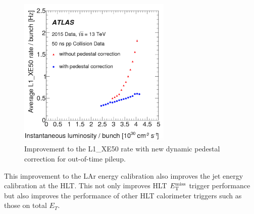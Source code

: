 \begin{figure}[h!]
  \begin{center}
    \includegraphics[width=0.65\textwidth]{figures/trigger/L1_XE50.png}\hspace{0.05\textwidth}
\end{center}
\caption{Improvement to the L1\_XE50 rate with new dynamic pedestal correction for out-of-time pileup.\cite{Trigger2015}}
\label{fig:trigScheme} 
\end{figure}

\indent This improvement to the LAr energy calibration also improves the jet energy calibration at the HLT.  This not only improves HLT $E_{\mathrm{T}}^{\mathrm{miss}}$ trigger performance but also improves the performance of other HLT calorimeter triggers such as those on total $E_T$. \cite{Trigger2016} \\